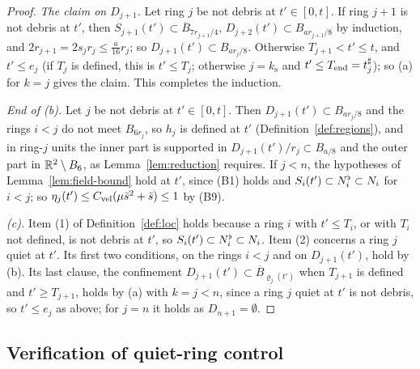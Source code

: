 \begin{proof}
\emph{The claim on $D_{j+1}$.} Let ring $j$ be not debris at $t'\in[0,t]$. If
ring $j+1$ is not debris at $t'$, then $S_{j+1}(t')\subset\overline
B_{7r_{j+1}/4}$, $D_{j+2}(t')\subset B_{ar_{j+1}/8}$ by induction, and
$2r_{j+1}=2s_jr_j\le\frac a{16}r_j$; so $D_{j+1}(t')\subset B_{ar_j/8}$.
Otherwise $T_{j+1}<t'\le t$, and $t'\le e_j$ (if $T_j$ is defined, this is
$t'\le T_j$; otherwise $j=k_{\mathrm s}$ and $t'\le T_{\mathrm{end}}=t^\sharp_j$); so (a) for
$k=j$ gives the claim. This completes the induction.

\emph{End of \textup{(b)}.} Let $j$ be not debris at $t'\in[0,t]$. Then
$D_{j+1}(t')\subset B_{ar_j/8}$ and the rings $i<j$ do not meet $B_{6r_j}$, so
$h_j$ is defined at $t'$ (Definition~\ref{def:regions}), and in ring-$j$ units
the inner part is supported in $D_{j+1}(t')/r_j\subset B_{a/8}$ and the outer part in
$\mathbb{R}^2\setminus B_6$, as Lemma~\ref{lem:reduction} requires. If $j<n$, the
hypotheses of Lemma~\ref{lem:field-bound} hold at $t'$, since (B1) holds and
$S_i(t')\subset N^{\flat}_i\subset N_i$ for $i<j$; so $\eta_j(t')\le
C_{\mathrm{vel}} (\mu\bar s^2+\bar s)\le1$ by (B9).

\emph{\textup{(c)}.} Item (1) of Definition~\ref{def:loc} holds because a ring
$i$ with $t'\le T_i$, or with $T_i$ not defined, is not debris at $t'$, so
$S_i(t')\subset N^{\flat}_i\subset N_i$. Item (2) concerns a ring $j$ quiet at
$t'$. Its first two conditions, on the rings $i<j$ and on $D_{j+1}(t')$, hold
by (b). Its last clause, the confinement $D_{j+1}(t')\subset\overline
B_{\varrho_j(t')}$ when $T_{j+1}$ is defined and $t'\ge T_{j+1}$, holds by (a)
with $k=j<n$, since a ring $j$ quiet at $t'$ is not debris, so $t'\le e_j$
as above; for $j=n$ it holds as $D_{n+1}=\emptyset$.
\end{proof}

\subsection{Verification of quiet-ring control}
\label{sec:bootstrap-quiet-control}

